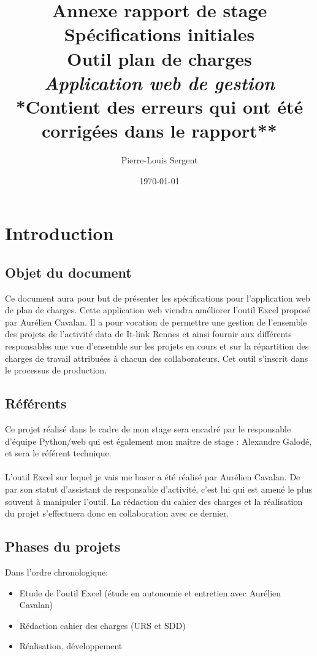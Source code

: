 \documentclass[french]{report}
\title{{\huge \textbf{Annexe rapport de stage}}\\
{\color{blue} \textbf{Spécifications initiales}}\\
Outil plan de charges\\
{\Large \textit{Application web de gestion}}\\
{\normalsize **Contient des erreurs qui ont été corrigées dans le rapport**}}
\date{\today}
\author{Pierre-Louis Sergent}
\begin{document}
    \maketitle

    \tableofcontents

\chapter{Introduction}
  \section{Objet du document}

Ce document aura pour but de présenter les spécifications pour l’application web
de plan de charges. Cette application web viendra améliorer l’outil Excel
proposé par Aurélien Cavalan. Il a pour vocation de permettre une gestion de
l'ensemble des projets de l’activité data de It-link Rennes et ainsi fournir
aux différents responsables une vue d’ensemble sur les projets en cours et sur
la répartition des charges de travail attribuées à chacun des collaborateurs.
Cet outil s’inscrit dans le processus de production.

  \section{Référents}

Ce projet réalisé dans le cadre de mon stage sera encadré par le responsable
d’équipe Python/web qui est également mon maître de stage : Alexandre Galodé, et
sera le référent technique.\\\\
L’outil Excel sur lequel je vais me baser a été réalisé par Aurélien Cavalan. De
par son statut d’assistant de responsable d’activité, c’est lui qui est amené le
plus souvent à manipuler l’outil. La rédaction du cahier des charges et la
réalisation du projet s’effectuera donc en collaboration avec ce dernier.

  \section{Phases du projets}

Dans l'ordre chronologique:
\begin{itemize}[label=\textbullet, font=\normalfont \color{blue}]
  \item{Etude de l'outil Excel (étude en autonomie et entretien avec Aurélien Cavalan)}
  \item{Rédaction cahier des charges (URS et SDD)}
  \item{Réalisation, développement}
\end{itemize}
\end{document}
